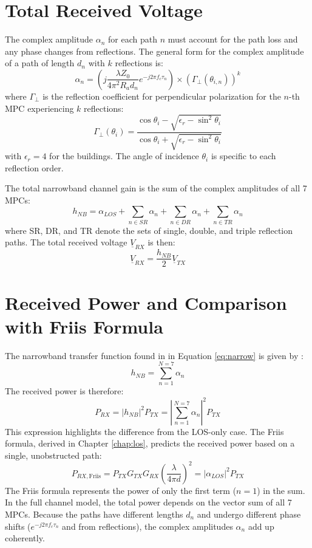 \section{Total Received Voltage}
The complex amplitude $\alpha_n$ for each path $n$ must account for the path loss and any phase changes from reflections. The general form for the complex amplitude of a path of length $d_n$ with $k$ reflections is:
\begin{equation}
	\alpha_n = \left( j \frac{\lambda Z_0}{4\pi^2 R_a d_n} e^{-j2\pi f_c \tau_n} \right) \times (\Gamma_{\perp}(\theta_{i,n}))^k
\end{equation}
where $\Gamma_{\perp}$ is the reflection coefficient for perpendicular polarization for the $n$-th MPC experiencing $k$ reflections:
\begin{equation}
	\Gamma_{\perp}(\theta_i) = \frac{\cos\theta_i - \sqrt{\epsilon_r - \sin^2\theta_i}}{\cos\theta_i + \sqrt{\epsilon_r - \sin^2\theta_i}}
\end{equation}
with $\epsilon_r = 4$ for the buildings. The angle of incidence $\theta_i$ is specific to each reflection order.

The total narrowband channel gain is the sum of the complex amplitudes of all 7 MPCs:
\begin{equation}
	h_{NB} = \alpha_{LOS} + \sum_{n \in SR} \alpha_n + \sum_{n \in DR} \alpha_n + \sum_{n \in TR} \alpha_n
\end{equation}
where SR, DR, and TR denote the sets of single, double, and triple reflection paths. The total received voltage $\underline{V}_{RX}$ is then:
\begin{equation}
	\underline{V}_{RX} = \frac{h_{NB}}{2} \underline{V}_{TX}
\end{equation}

\section{Received Power and Comparison with Friis Formula}
The narrowband transfer function found in in Equation \eqref{eq:narrow} is given by :
\begin{equation}
	h_{NB} = \sum_{n=1}^{N=7} \alpha_n
\end{equation}
The received power is therefore:
\begin{equation}
	P_{RX} = |h_{NB}|^2 P_{TX} = \left| \sum_{n=1}^{N=7} \alpha_n \right|^2 P_{TX}
\end{equation}
This expression highlights the difference from the LOS-only case. The Friis formula, derived in Chapter \ref{chap:los}, predicts the received power based on a single, unobstructed path:
\begin{equation}
	P_{RX, \text{Friis}} = P_{TX} G_{TX} G_{RX} \left( \frac{\lambda}{4\pi d} \right)^2 = |\alpha_{LOS}|^2 P_{TX}
\end{equation}
The Friis formula represents the power of only the first term ($n=1$) in the sum. In the full channel model, the total power depends on the vector sum of all 7 MPCs. Because the paths have different lengths $d_n$ and undergo different phase shifts ($e^{-j2\pi f_c \tau_n}$ and from reflections), the complex amplitudes $\alpha_n$ add up coherently.

